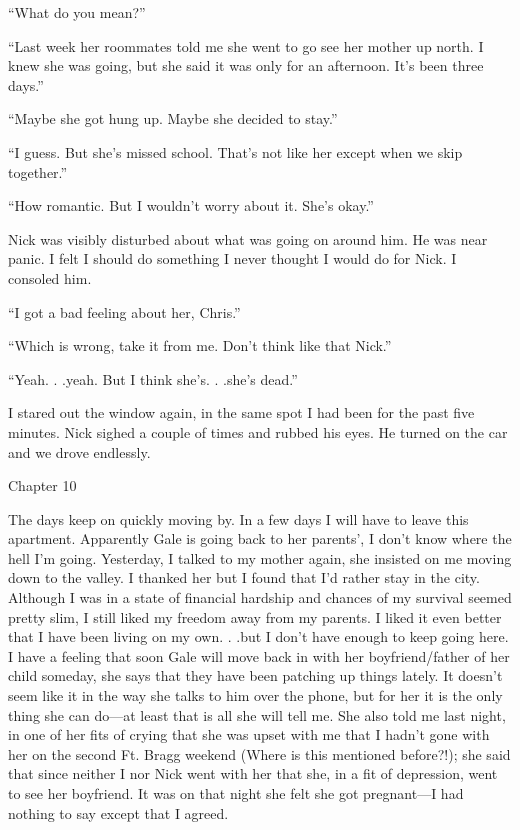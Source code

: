 ``What do you mean?''

``Last week her roommates told me she went to go see her mother up
north. I knew she was going, but she said it was only for an afternoon.
It's been three days.''

``Maybe she got hung up. Maybe she decided to stay.''

``I guess. But she's missed school. That's not like her except when we
skip together.''

``How romantic. But I wouldn't worry about it. She's okay.''

Nick was visibly disturbed about what was going on around him. He was
near panic. I felt I should do something I never thought I would do for
Nick. I consoled him.

``I got a bad feeling about her, Chris.''

``Which is wrong, take it from me. Don't think like that Nick.''

``Yeah. . .yeah. But I think she's. . .she's dead.''

I stared out the window again, in the same spot I had been for the past
five minutes. Nick sighed a couple of times and rubbed his eyes. He
turned on the car and we drove endlessly.

Chapter 10

The days keep on quickly moving by. In a few days I will have to leave
this apartment. Apparently Gale is going back to her parents', I don't
know where the hell I'm going. Yesterday, I talked to my mother again,
she insisted on me moving down to the valley. I thanked her but I found
that I'd rather stay in the city. Although I was in a state of financial
hardship and chances of my survival seemed pretty slim, I still liked my
freedom away from my parents. I liked it even better that I have been
living on my own. . .but I don't have enough to keep going here. I have
a feeling that soon Gale will move back in with her boyfriend/father of
her child someday, she says that they have been patching up things
lately. It doesn't seem like it in the way she talks to him over the
phone, but for her it is the only thing she can do---at least that is
all she will tell me. She also told me last night, in one of her fits of
crying that she was upset with me that I hadn't gone with her on the
second Ft. Bragg weekend (Where is this mentioned before?!); she said
that since neither I nor Nick went with her that she, in a fit of
depression, went to see her boyfriend. It was on that night she felt she
got pregnant---I had nothing to say except that I agreed.

